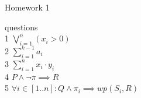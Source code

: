 \documentclass[12pt]{article}
\begin{document}
\author{Lizhipeng}

\begin{center}
{\Large Homework 1}
\end{center}
 questions
 ~\\1 $\bigvee_{i=1}^{n}(x_i > 0)$
~\\2 $\sum_{i=1}^{k-1} a_i$
~\\3 $\sum\limits_{i=1}^{n}x_i\cdot y_i$
~\\4 $P \land \neg\pi \implies R$
~\\5 $\forall i \in [1..n]\colon Q \land \pi_i \implies wp(S_i, R)$

\end{document}
